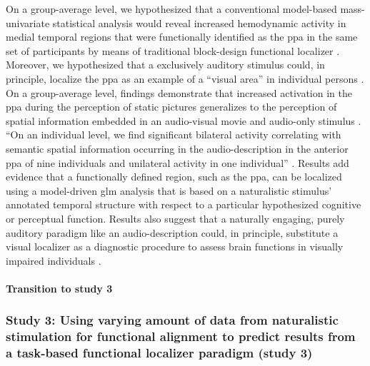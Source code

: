On a group-average level, we hypothesized that a conventional model-based
mass-univariate statistical analysis would reveal increased hemodynamic activity
in medial temporal regions that were functionally identified as the \ac{ppa} in
the same set of participants by means of traditional block-design functional
localizer \citep{sengupta2016extension}.
Moreover, we hypothesized that a exclusively auditory stimulus could, in
principle, localize the \ac{ppa} as an example of a ``visual area'' in
individual persons \citep{haeusler2022processing}.
On a group-average level, findings demonstrate that increased activation in the
\ac{ppa} during the perception of static pictures generalizes to the perception
of spatial information embedded in an audio-visual movie and audio-only stimulus
\citep{haeusler2022processing}.
``On an individual level, we find significant bilateral activity correlating
with semantic spatial information occurring in the audio-description in the
anterior \ac{ppa} of nine individuals and unilateral activity in one
individual'' \citep{haeusler2022processing}.
%
Results add evidence that a functionally defined region, such as the \ac{ppa},
can be localized using a model-driven \ac{glm} analysis that is based on a
naturalistic stimulus' annotated temporal structure with respect to a particular
hypothesized cognitive or perceptual function.
%
Results also suggest that a naturally engaging, purely auditory paradigm like an
audio-description could, in principle, substitute a visual localizer as a
diagnostic procedure to assess brain functions in visually
impaired individuals \citep{haeusler2022processing}.

\paragraph{Transition to study 3}




\subsubsection{Study 3: Using varying amount of data from naturalistic
stimulation for functional alignment to predict results from a task-based
functional localizer paradigm (study 3)}

